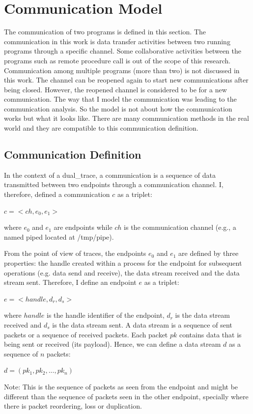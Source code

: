 \section{Communication Model}\label{definition}
The communication of two programs is defined in this section. The communication in this work is data transfer activities between two running programs through a specific channel. Some collaborative activities between the programs such as remote procedure call is out of the scope of this research. Communication among multiple programs (more than two) is not discussed in this work. The channel can be reopened again to start new communications after being closed. However, the reopened channel is considered to be for a new communication. The way that I model the communication was leading to the communication analysis. So the model is not about how the communication works but what it looks like. There are many communication methods in the real world and they are compatible to this communication definition. 

\subsection{Communication Definition}
In the context of a dual\_trace, a communication is a sequence of data transmitted between two endpoints through a communication channel. I, therefore, defined a communication $c$ as a triplet:

$c =<ch, e_0, e_1>$

where $e_0$ and $e_1$ are endpoints while $ch$ is the communication channel (e.g., a named piped located at /tmp/pipe).

From the point of view of traces, the endpoints $e_0$ and $e_1$ are defined by three properties: the handle created within a process for the endpoint for subsequent operations (e.g. data send and receive), the data stream received and the data stream sent. Therefore, I define an endpoint $e$ as a triplet:

$ e =<handle, d_r, d_s>$

where $handle$ is the handle identifier of the endpoint, $d_r$ is the data stream received and $d_s$ is the data stream sent. A data stream is a sequence of sent packets or a sequence of received packets. Each packet $pk$ contains data that is being sent or received (its payload). Hence, we can define a data stream $d$ as a sequence of $n$ packets:

$ d = (pk_1, pk_2, ..., pk_n)$ 

Note: This is the sequence of packets as seen from the endpoint and might be different than the sequence of packets seen in the other endpoint, specially where there is packet reordering, loss or duplication.

